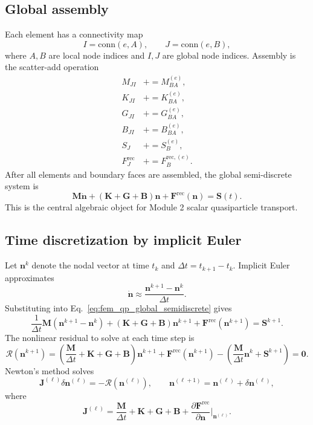 \documentclass[11pt]{article}
\newcommand{\rec}{\mathrm{rec}}
\begin{document}
\subsection{Global assembly}
Each element has a connectivity map
\begin{equation}
I=\mathrm{conn}(e,A),\qquad J=\mathrm{conn}(e,B),
\end{equation}
where $A,B$ are local node indices and $I,J$ are global node indices. Assembly is the scatter-add operation
\begin{align}
M_{JI} &\mathrel{+}=M_{BA}^{(e)},\\
K_{JI} &\mathrel{+}=K_{BA}^{(e)},\\
G_{JI} &\mathrel{+}=G_{BA}^{(e)},\\
B_{JI} &\mathrel{+}=B_{BA}^{(e)},\\
S_J &\mathrel{+}=S_B^{(e)},\\
F_J^{\rec} &\mathrel{+}=F_B^{\rec,(e)}.
\end{align}
After all elements and boundary faces are assembled, the global semi-discrete system is
\begin{equation}
\bm{M}\dot{\bm{n}}
+(\bm{K}+\bm{G}+\bm{B})\bm{n}
+\bm{F}^{\rec}(\bm{n})
=\bm{S}(t).
\label{eq:fem_qp_global_semidiscrete}
\end{equation}
This is the central algebraic object for Module 2 scalar quasiparticle transport.

\subsection{Time discretization by implicit Euler}
Let $\bm{n}^{k}$ denote the nodal vector at time $t_k$ and $\Delta t=t_{k+1}-t_k$. Implicit Euler approximates
\begin{equation}
\dot{\bm{n}}\approx\frac{\bm{n}^{k+1}-\bm{n}^{k}}{\Delta t}.
\end{equation}
Substituting into Eq.~\eqref{eq:fem_qp_global_semidiscrete} gives
\begin{equation}
\frac{1}{\Delta t}\bm{M}(\bm{n}^{k+1}-\bm{n}^{k})
+(\bm{K}+\bm{G}+\bm{B})\bm{n}^{k+1}
+\bm{F}^{\rec}(\bm{n}^{k+1})
=\bm{S}^{k+1}.
\label{eq:fem_qp_implicit_euler}
\end{equation}
The nonlinear residual to solve at each time step is
\begin{equation}
\bm{\mathcal{R}}(\bm{n}^{k+1})
=\left(\frac{\bm{M}}{\Delta t}+\bm{K}+\bm{G}+\bm{B}\right)\bm{n}^{k+1}
+\bm{F}^{\rec}(\bm{n}^{k+1})
-\left(\frac{\bm{M}}{\Delta t}\bm{n}^{k}+\bm{S}^{k+1}\right)
=\bm{0}.
\label{eq:fem_qp_nonlinear_residual}
\end{equation}
Newton's method solves
\begin{equation}
\bm{J}^{(\ell)}\delta\bm{n}^{(\ell)}=-\bm{\mathcal{R}}(\bm{n}^{(\ell)}),
\qquad
\bm{n}^{(\ell+1)}=\bm{n}^{(\ell)}+\delta\bm{n}^{(\ell)},
\end{equation}
where
\begin{equation}
\bm{J}^{(\ell)}=\frac{\bm{M}}{\Delta t}+\bm{K}+\bm{G}+\bm{B}
+\frac{\partial\bm{F}^{\rec}}{\partial\bm{n}}\bigg|_{\bm{n}^{(\ell)}}.
\label{eq:fem_qp_newton_jacobian}
\end{equation}
\end{document}
